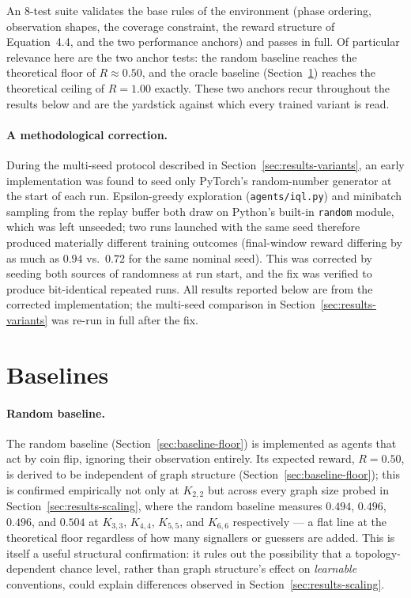 \documentclass[a4paper,twoside,12pt]{report}
\begin{document}
An 8-test suite validates the base rules of the environment (phase ordering,
observation shapes, the coverage constraint, the reward structure of
Equation~4.4, and the two performance anchors) and passes in full. Of
particular relevance here are the two anchor tests: the random baseline
reaches the theoretical floor of $R \approx 0.50$, and the oracle baseline
(Section~\ref{sec:results-baselines}) reaches the theoretical ceiling of
$R = 1.00$ exactly. These two anchors recur throughout the results below and
are the yardstick against which every trained variant is read.

\paragraph{A methodological correction.} During the multi-seed protocol
described in Section~\ref{sec:results-variants}, an early implementation was
found to seed only PyTorch's random-number generator at the start of each
run. Epsilon-greedy exploration (\texttt{agents/iql.py}) and minibatch
sampling from the replay buffer both draw on Python's built-in \texttt{random}
module, which was left unseeded; two runs launched with the same seed
therefore produced materially different training outcomes (final-window
reward differing by as much as $0.94$ vs.\ $0.72$ for the same nominal seed).
This was corrected by seeding both sources of randomness at run start, and the
fix was verified to produce bit-identical repeated runs. All results reported
below are from the corrected implementation; the multi-seed comparison in
Section~\ref{sec:results-variants} was re-run in full after the fix.

\section{Baselines}
\label{sec:results-baselines}

\paragraph{Random baseline.} The random baseline (Section~\ref{sec:baseline-floor})
is implemented as agents that act by coin flip, ignoring their observation
entirely. Its expected reward, $R = 0.50$, is derived to be independent of
graph structure (Section~\ref{sec:baseline-floor}); this is confirmed
empirically not only at $K_{2,2}$ but across every graph size probed in
Section~\ref{sec:results-scaling}, where the random baseline measures
$0.494$, $0.496$, $0.496$, and $0.504$ at $K_{3,3}$, $K_{4,4}$, $K_{5,5}$, and
$K_{6,6}$ respectively --- a flat line at the theoretical floor regardless of
how many signallers or guessers are added. This is itself a useful structural
confirmation: it rules out the possibility that a topology-dependent chance
level, rather than graph structure's effect on \emph{learnable} conventions,
could explain differences observed in Section~\ref{sec:results-scaling}.
\end{document}

